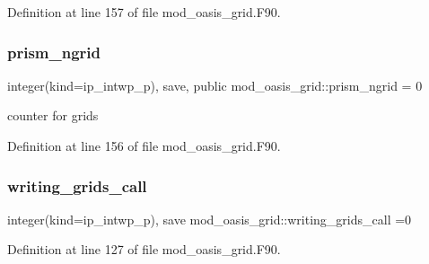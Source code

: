Definition at line 157 of file mod\+\_\+oasis\+\_\+grid.\+F90.

\mbox{\label{namespacemod__oasis__grid_ad6e65eb9872825ac98db6ce1f7dcd618}} 
\subsubsection{\texorpdfstring{prism\+\_\+ngrid}{prism\_ngrid}}
{\footnotesize\ttfamily integer(kind=ip\+\_\+intwp\+\_\+p), save, public mod\+\_\+oasis\+\_\+grid\+::prism\+\_\+ngrid = 0}



counter for grids 



Definition at line 156 of file mod\+\_\+oasis\+\_\+grid.\+F90.

\mbox{\label{namespacemod__oasis__grid_a587c160986cc015e4367b1cca13babfb}} 
\subsubsection{\texorpdfstring{writing\+\_\+grids\+\_\+call}{writing\_grids\_call}}
{\footnotesize\ttfamily integer(kind=ip\+\_\+intwp\+\_\+p), save mod\+\_\+oasis\+\_\+grid\+::writing\+\_\+grids\+\_\+call =0\hspace{0.3cm}{\ttfamily [private]}}



Definition at line 127 of file mod\+\_\+oasis\+\_\+grid.\+F90.

